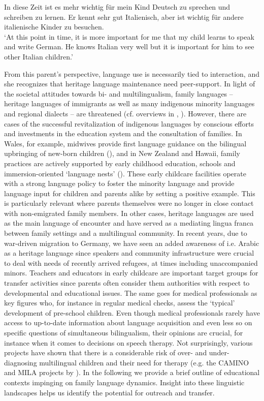 \documentclass[output=paper,colorlinks,citecolor=brown]{langscibook}
\begin{document}
\ea\label{ex:04:3}
In diese Zeit ist es mehr wichtig für mein Kind Deutsch zu sprechen und schreiben zu lernen. Er kennt sehr gut Italienisch, aber ist wichtig für andere italienische Kinder zu besuchen.\\
\trans `At this point in time, it is more important for me that my child learns to speak and write German. He knows Italian very well but it is important for him to see other Italian children.'
\z

From this parent’s perspective, language use is necessarily tied to interaction, and she recognizes that heritage language maintenance need peer-support. In light of the societal attitudes towards bi- and multilingualism, family languages – heritage languages of immigrants as well as many indigenous minority languages and regional dialects – are threatened (cf. overviews in \cite{Baker2011}, \cite{Brehmer&Treffers-Daller2020}). However, there are cases of the successful revitalization of indigenous languages by conscious efforts and investments in the education system and the consultation of families. In Wales, for example, midwives provide first language guidance on the bilingual upbringing of new-born children (\cite{Edwards2015}), and in New Zealand and Hawaii, family practices are actively supported by early childhood education, schools and immersion-oriented ‘language nests’ (\cite{Hinton2013}). These early childcare facilities operate with a strong language policy to foster the minority language and provide language input for children and parents alike by setting a positive example. This is particularly relevant where parents themselves were no longer in close contact with non-emigrated family members. In other cases, heritage languages are used as the main language of encounter and have served as a mediating lingua franca between family settings and a multilingual community. In recent years, due to war-driven migration to Germany, we have seen an added awareness of i.e. Arabic as a heritage language since speakers and community infrastructure were crucial to deal with needs of recently arrived refugees, at times including unaccompanied minors.
Teachers and educators in early childcare are important target groups for transfer activities since parents often consider them authorities with respect to developmental and educational issues. The same goes for medical professionals as key figures who, for instance in regular medical checks, assess the ‘typical’ development of pre-school children. Even though medical professionals rarely have access to up-to-date information about language acquisition and even less so on specific questions of simultaneous bilingualism, their opinions are crucial, for instance when it comes to decisions on speech therapy. Not surprisingly, various projects have shown that there is a considerable risk of over- and under-diagnosing multilingual children and their need for therapy (e.g. the CAMINO and MILA projects by \cite{Schulz2013, VoetCornelli&al.2013, Tracy&al.2018}).
In the following we provide a brief outline of educational contexts  impinging on family language dynamics. Insight into these linguistic landscapes helps us identify the potential for outreach and transfer.
\end{document}
